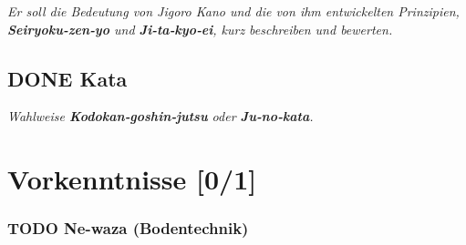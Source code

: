 \documentclass[11pt]{article}
\begin{document}
\emph{Er soll die Bedeutung von Jigoro Kano und die von ihm entwickelten Prinzipien, \textbf{Seiryoku‐zen‐yo} und \textbf{Ji‐ta‐kyo‐ei}, kurz beschreiben und bewerten.}

\subsection{{\bfseries\sffamily DONE} Kata}
\label{sec:org0f3bd67}
\emph{Wahlweise \textbf{Kodokan‐goshin‐jutsu} oder \textbf{Ju‐no‐kata}.}


\section{Vorkenntnisse [0/1]}
\label{sec:org0dce2f1}

\subsubsection{{\bfseries\sffamily TODO} Ne-waza (Bodentechnik)}
\label{sec:org5516c4d}
\end{document}
